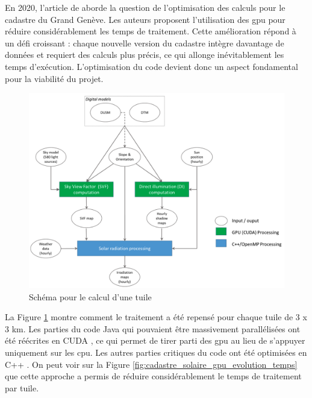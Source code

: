 \par{En 2020, l'article \cite{stendardo_gpu-enabled_2020} de \citeauthor{stendardo_gpu-enabled_2020} aborde la question de l'optimisation des calculs pour le cadastre du Grand Genève. Les auteurs proposent l'utilisation des \acrshort{gpu} pour réduire considérablement les temps de traitement. Cette amélioration répond à un défi croissant : chaque nouvelle version du cadastre intègre davantage de données et requiert des calculs plus précis, ce qui allonge inévitablement les temps d'exécution. L'optimisation du code devient donc un aspect fondamental pour la viabilité du projet.}
\begin{figure}[H]
    \centering
    \includegraphics[width=1\linewidth]{02-main//figures/cadastre_solaire_gpu.png}
    \caption{Schéma pour le calcul d'une tuile}
    \label{fig:cadastre_solaire_gpu}
\end{figure}
La Figure \ref{fig:cadastre_solaire_gpu} montre comment le traitement a été repensé pour chaque tuile de 3 x 3 km. Les parties du code Java qui pouvaient être massivement parallélisées ont été réécrites en CUDA \cite{nvidia_cuda_nodate}, ce qui permet de tirer parti des \acrshort{gpu} au lieu de s'appuyer uniquement sur les \acrshort{cpu}. Les autres parties critiques du code ont été optimisées en C++ \cite{noauthor_c_2025}. On peut voir sur la Figure \ref{fig:cadastre_solaire_gpu_evolution_temps} que cette approche a permis de réduire considérablement le temps de traitement par tuile.

